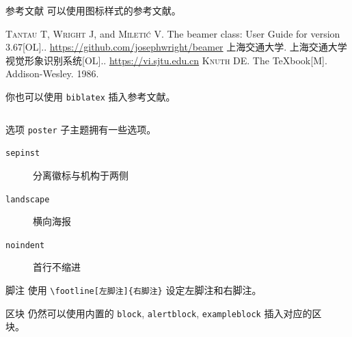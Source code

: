 \documentclass{ctexbeamer}
\begin{document}
\begin{frame}[fragile]
\begin{columns}[T]
\begin{column}{.45\textwidth}
\begin{stampblock}{参考文献}
          可以使用图标样式的参考文献。

          \begin{bibliolist}{00}
            \onlineitem \textsc{Tantau T}, \textsc{Wright J}, and \textsc{Mileti\'c V}.\newblock
            The beamer class: User Guide for version 3.67[OL].. \url{https://github.com/josephwright/beamer}
            \articleitem \textsc{上海交通大学}.\newblock
            上海交通大学视觉形象识别系统[OL].. \url{https://vi.sjtu.edu.cn}
            \bookitem \textsc{Knuth DE}.\newblock
            The \TeX{}book[M].\newblock
            Addison-Wesley. 1986.
          \end{bibliolist}

          你也可以使用 \texttt{biblatex} 插入参考文献。

          \printbibliography
          
        \end{stampblock}
        
      \end{column}
    \end{columns}

    \posterstamphrule[cprimary]

    \begin{columns}
      \begin{column}{0.45\textwidth}
        \begin{block}{选项}
          \texttt{poster} 子主题拥有一些选项。
          \begin{description}
            \item[\texttt{sepinst}] 分离徽标与机构于两侧
            \item[\texttt{landscape}] 横向海报
            \item[\texttt{noindent}] 首行不缩进  
          \end{description}
        \end{block}
        \begin{alertblock}{脚注}
          使用 \texttt{\textbackslash{}footline[左脚注]\{右脚注\}} 设定左脚注和右脚注。
        \end{alertblock}
        \begin{exampleblock}{区块}
          仍然可以使用内置的 \texttt{block}, \texttt{alertblock}, \texttt{exampleblock} 插入对应的区块。
        \end{exampleblock}
      \end{column}
      \begin{column}{0.45\textwidth}
        

\end{column}
\end{columns}
\end{frame}
\end{document}
